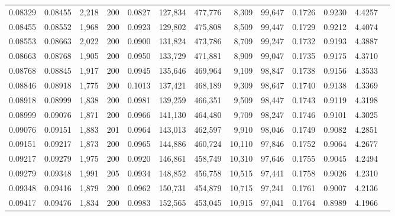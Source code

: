 \begin{tabular}{rrrrrrrrrrrrr}
0.08329 & 0.08455 & 2,218 & 200 &                                     0.0827 & 127,834 & 477,776 &   8,309 &  99,647 & 0.1726 & 0.9230 & 4.4257 \\
0.08455 & 0.08552 & 1,968 & 200 &                                     0.0923 & 129,802 & 475,808 &   8,509 &  99,447 & 0.1729 & 0.9212 & 4.4074 \\
0.08553 & 0.08663 & 2,022 & 200 &                                     0.0900 & 131,824 & 473,786 &   8,709 &  99,247 & 0.1732 & 0.9193 & 4.3887 \\
0.08663 & 0.08768 & 1,905 & 200 &                                     0.0950 & 133,729 & 471,881 &   8,909 &  99,047 & 0.1735 & 0.9175 & 4.3710 \\
0.08768 & 0.08845 & 1,917 & 200 &                                     0.0945 & 135,646 & 469,964 &   9,109 &  98,847 & 0.1738 & 0.9156 & 4.3533 \\
0.08846 & 0.08918 & 1,775 & 200 &                                     0.1013 & 137,421 & 468,189 &   9,309 &  98,647 & 0.1740 & 0.9138 & 4.3369 \\
0.08918 & 0.08999 & 1,838 & 200 &                                     0.0981 & 139,259 & 466,351 &   9,509 &  98,447 & 0.1743 & 0.9119 & 4.3198 \\
0.08999 & 0.09076 & 1,871 & 200 &                                     0.0966 & 141,130 & 464,480 &   9,709 &  98,247 & 0.1746 & 0.9101 & 4.3025 \\
0.09076 & 0.09151 & 1,883 & 201 &                                     0.0964 & 143,013 & 462,597 &   9,910 &  98,046 & 0.1749 & 0.9082 & 4.2851 \\
0.09151 & 0.09217 & 1,873 & 200 &                                     0.0965 & 144,886 & 460,724 &  10,110 &  97,846 & 0.1752 & 0.9064 & 4.2677 \\
0.09217 & 0.09279 & 1,975 & 200 &                                     0.0920 & 146,861 & 458,749 &  10,310 &  97,646 & 0.1755 & 0.9045 & 4.2494 \\
0.09279 & 0.09348 & 1,991 & 205 &                                     0.0934 & 148,852 & 456,758 &  10,515 &  97,441 & 0.1758 & 0.9026 & 4.2310 \\
0.09348 & 0.09416 & 1,879 & 200 &                                     0.0962 & 150,731 & 454,879 &  10,715 &  97,241 & 0.1761 & 0.9007 & 4.2136 \\
0.09417 & 0.09476 & 1,834 & 200 &                                     0.0983 & 152,565 & 453,045 &  10,915 &  97,041 & 0.1764 & 0.8989 & 4.1966 \\

\end{tabular}
